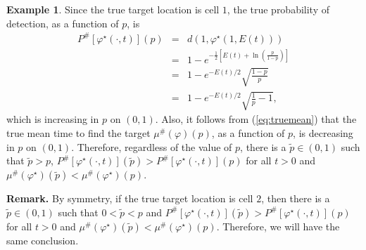 \documentclass[12pt]{article}
\theoremstyle{plain}
\theoremstyle{definition}
\newtheorem{example}{Example}%
\theoremstyle{remark}
\begin{document}
\begin{example}
Since the true target location is cell $1$,  the true probability of detection, as a function of $p$,  is 
\begin{eqnarray*}
P^{\#}[\varphi^\star(\cdot, t)] (p)&=&  d(1,  \varphi^\star (1, E(t)))\\
				&=& 1-e^{- \frac{1}{2}\left[E(t)+\ln \left(\frac{p}{1-p}\right) \right]}\\
				&=& 1-e^{-E(t)/2}\sqrt{\frac{1-p}{p}}\\
				&=& 1-e^{-E(t)/2}\sqrt{\frac{1}{p}-1},				
\end{eqnarray*}
which is increasing in $p$ on $(0, 1)$. Also, it follows from (\ref{eq:truemean}) that the true mean time to find the target $\mu^{\#}(\varphi)(p)$, as a function of $p$, is decreasing in $p$ on $(0, 1)$.  Therefore,  regardless of the value of $p$, there is a $\widetilde{p}\in (0, 1)$ such that $\widetilde{p}>p$,  $P^{\#} [\varphi^\star(\cdot, t)](\widetilde{p})>P^{\#}[\varphi^\star(\cdot, t)](p)$ for all $t>0$ and $\mu^{\#} (\varphi^\star)(\widetilde{p})<\mu^{\#} (\varphi^\star)(p)$.  


\end{example}
\noindent \textbf{Remark.} By symmetry,   if the true target location is cell $2$, then there is a $\widetilde{p}\in (0, 1)$ such that $0<\widetilde{p}<p$ and  $P^{\#} [\varphi^\star(\cdot, t)](\widetilde{p})>P^{\#}[\varphi^\star(\cdot, t)](p)$ for all $t>0$ and $\mu^{\#}(\varphi^\star)(\widetilde{p})<\mu^{\#} (\varphi^\star)(p)$.  Therefore, we will have the same conclusion.
\end{document}
